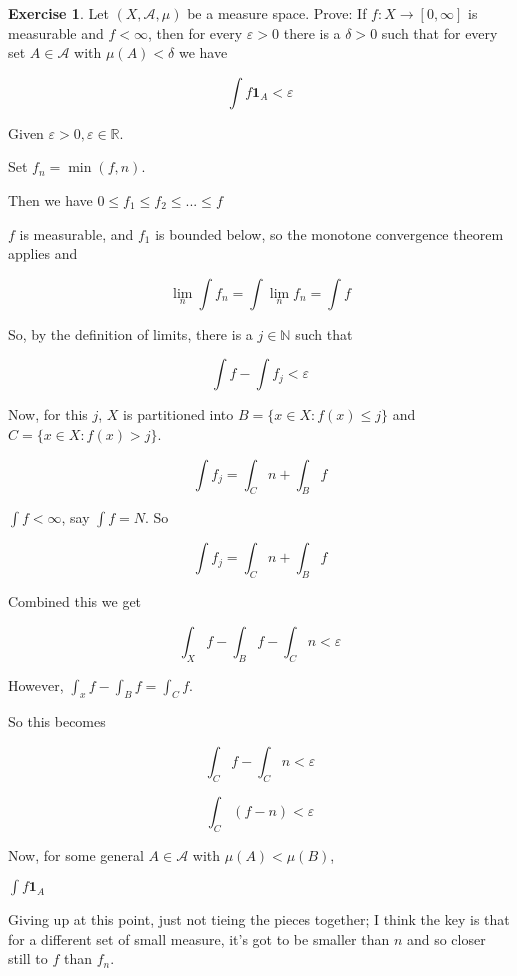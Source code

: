 \documentclass[11pt,oneside]{article}
\numberwithin{equation}{section}
\theoremstyle{definition}
\newtheorem{exercise}{Exercise}
\def\RR{\mathbb{R}}
\def\NN{\mathbb{N}}
\def\fancyA{\mathscr{A}}
\def\limn{\lim \limits _n}
\def\one{\mathbf{1}}
\begin{document}
\begin{exercise}
  Let $(X, \fancyA, \mu)$ be a measure space.  Prove:
  If $f: X \to [0, \infty]$ is measurable and $ f < \infty$, then
  for every $\varepsilon > 0$ there is a $\delta > 0$ such that
  for every set $A \in \fancyA$ with $\mu(A) < \delta$ we
  have

  \[
  \int f \one_A < \varepsilon
  \]


\end{exercise}

\begin{solution}

  Given $ \varepsilon > 0, \varepsilon \in \RR$.  
  
  Set $f_n = \min(f, n)$.  
  
  Then we have $0 \leq f_1 \leq f_2 \leq ... \leq f$

  $f$ is measurable, and $f_1$ is bounded below, so the monotone convergence theorem applies and

  \[
  \limn \int f_n = \int \limn f_n = \int f
  \]

  So, by the definition of limits, there is a $j \in \NN$ such that

  \[
  \int f - \int f_j < \varepsilon
  \]

  Now, for this $j$, $X$ is partitioned into $ B = \{ x \in X : f(x) \leq j \}$
  and $ C = \{ x \in X : f(x) > j \} $.

  \[
  \int f_j = \int _ C n + \int _B f
  \]

  $ \int f < \infty$, say $\int f = N$.  So

  \[
  \int f_j = \int _C n + \int _B f
  \]

  Combined this we get

  \[
  \int _X f - \int _B f - \int _C n < \varepsilon
  \]
  
  However, $\int_x f - \int_B f  = \int_C f$. 

  So this becomes
  
  \[
  \int_C f - \int_C n < \varepsilon
  \]

  \[
  \int_C (f - n) < \varepsilon
  \]

  Now, for some general $A \in \fancyA$ with $\mu(A) < \mu(B)$,

  $\int f \one _ A $

  Giving up at this point, just not tieing the pieces together; I think the key is that
  for a different set of small measure, it's got to be smaller than $n$ and so closer
  still to $f$ than $f_n$.
  
  
\end{solution}
\end{document}
